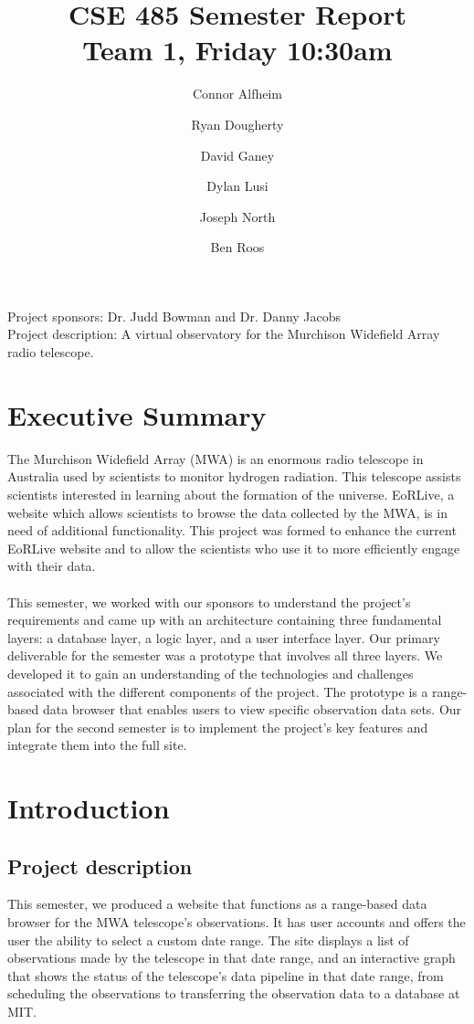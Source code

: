 \documentclass[12pt]{article}
\begin{document}
\begin{spacing}{.4}
\setlength{\droptitle}{-7em}
\title{CSE 485 Semester Report \\  Team 1, Friday 10:30am}
\author{Connor Alfheim \and Ryan Dougherty \and David Ganey \and Dylan Lusi \and Joseph North \and Ben Roos}
\maketitle
\end{spacing}

\begin{spacing}{1.5}
\noindent
Project sponsors: Dr. Judd Bowman and Dr. Danny Jacobs \\
Project description: A virtual observatory for the Murchison Widefield Array radio telescope.
\newpage

\tableofcontents
\newpage

\section{Executive Summary}
The Murchison Widefield Array (MWA) is an enormous radio telescope in Australia used by scientists to monitor hydrogen radiation. This telescope assists scientists interested in learning about the formation of the universe. EoRLive, a website which allows scientists to browse the data collected by the MWA, is in need of additional functionality. This project was formed to enhance the current EoRLive website and to allow the scientists who use it to more efficiently engage with their data.
\\ \\
This semester, we worked with our sponsors to understand the project's requirements and came up with an architecture containing three fundamental layers: a database layer, a logic layer, and a user interface layer. Our primary deliverable for the semester was a prototype that involves all three layers. We developed it to gain an understanding of the technologies and challenges associated with the different components of the project. The prototype is a range-based data browser that enables users to view specific observation data sets. Our plan for the second semester is to implement the project's key features and integrate them into the full site.

\section{Introduction}
\subsection{Project description}
This semester, we produced a website that functions as a range-based data browser for the MWA telescope's observations. It has user accounts and offers the user the ability to select a custom date range. The site displays a list of observations made by the telescope in that date range, and an interactive graph that shows the status of the telescope's data pipeline in that date range, from scheduling the observations to transferring the observation data to a database at MIT.

\end{spacing}
\end{document}
